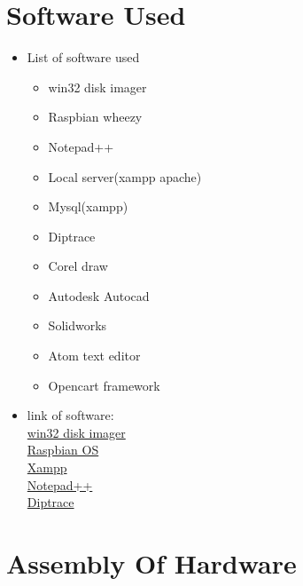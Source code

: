 \documentclass[a4paper,12pt,oneside]{book}
\begin{document}
\section{Software Used}
\begin{itemize}
   \item List of software used
  \begin{itemize}
   \item  win32 disk imager
   \item  Raspbian wheezy
   \item Notepad++
   \item Local server(xampp apache)
   \item Mysql(xampp)
   \item Diptrace
   \item Corel draw
   \item Autodesk Autocad
   \item Solidworks
   \item Atom text editor
   \item Opencart framework
  \end{itemize}
\end{itemize} 
\begin{itemize}
   \item link of software: \\
  \href{https://sourceforge.net/projects/win32diskimager/}{win32 disk imager}\\
  \href{https://www.raspberrypi.org/downloads/}{Raspbian OS}\\
  \href{https://www.apachefriends.org/download.html}{Xampp}\\
  \href{https://notepad-plus-plus.org/download/v6.9.2.html}{Notepad++}\\
  \href{http://diptrace.com/download-diptrace/}{Diptrace}
\end{itemize}

\section{Assembly Of Hardware}
\end{document}
